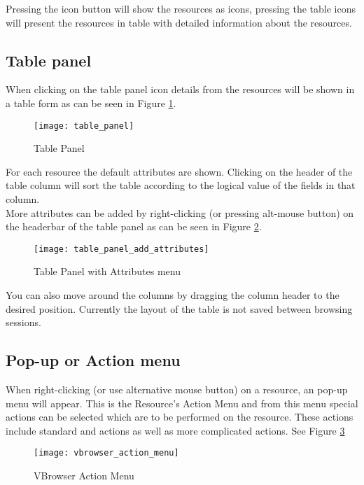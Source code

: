 Pressing the icon button will show the resources as icons, pressing the table
icons will present the resources in table with detailed information about the
resources. 

\subsection{Table panel}
\label{section:table_panel} 

When clicking on the table panel icon details from the resources will be
shown in a table form as can be seen in Figure  \ref{fig:table_panel}. 

\begin{figure}[htbp]
\centerline{\texttt{[image: table\_panel]}}
\caption{Table Panel}
\label{fig:table_panel}
\end{figure}

For each resource the default attributes are shown. 
Clicking on the header of the table column will sort the table according to the
logical value of the fields in that column. \\
More attributes can be added by right-clicking (or pressing alt-mouse button) on
the headerbar of the table panel as can be seen in 
Figure \ref{fig:table_panel_add_attributes}.\\


\begin{figure}[htbp]
\centerline{\texttt{[image: table\_panel\_add\_attributes]}}
\caption{Table Panel with Attributes menu}
\label{fig:table_panel_add_attributes}
\end{figure}

You can also move around the columns by dragging the column header to the 
desired position. 
Currently the layout of the table is not saved between browsing sessions. 

\subsection{Pop-up or Action menu}

When right-clicking (or use alternative mouse button) on a resource, an pop-up
menu will appear. This is the Resource's Action Menu and from this menu special
actions can be selected which are to be performed on the resource. 
These actions include standard  and  actions as well as 
more complicated actions. See Figure \ref{fig:vbrowser_action_menu}

 \begin{figure}[htbp]
  \centerline{\texttt{[image: vbrowser\_action\_menu]}}
  \caption{VBrowser Action Menu}
  \label{fig:vbrowser_action_menu}
 \end{figure}
  
